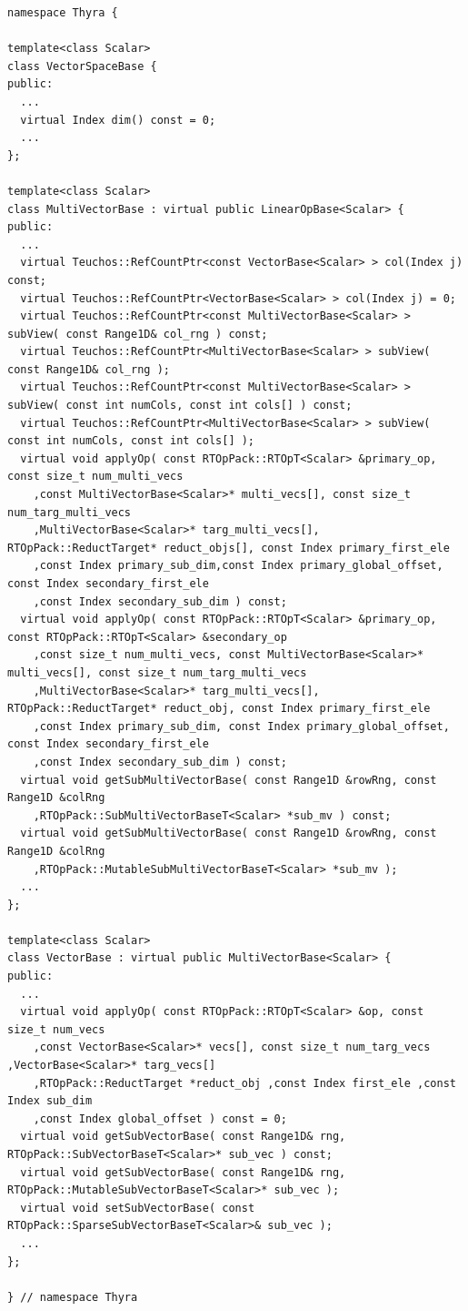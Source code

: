 \documentclass[pdf,ps2pdf,11pt]{SANDreport}
\begin{document}
{\scriptsize\begin{verbatim}
namespace Thyra {

template<class Scalar>
class VectorSpaceBase {
public:
  ...
  virtual Index dim() const = 0;
  ...
};

template<class Scalar>
class MultiVectorBase : virtual public LinearOpBase<Scalar> {
public:
  ...
  virtual Teuchos::RefCountPtr<const VectorBase<Scalar> > col(Index j) const;
  virtual Teuchos::RefCountPtr<VectorBase<Scalar> > col(Index j) = 0;
  virtual Teuchos::RefCountPtr<const MultiVectorBase<Scalar> > subView( const Range1D& col_rng ) const;
  virtual Teuchos::RefCountPtr<MultiVectorBase<Scalar> > subView( const Range1D& col_rng );
  virtual Teuchos::RefCountPtr<const MultiVectorBase<Scalar> > subView( const int numCols, const int cols[] ) const;
  virtual Teuchos::RefCountPtr<MultiVectorBase<Scalar> > subView( const int numCols, const int cols[] );
  virtual void applyOp( const RTOpPack::RTOpT<Scalar> &primary_op, const size_t num_multi_vecs
    ,const MultiVectorBase<Scalar>* multi_vecs[], const size_t num_targ_multi_vecs
    ,MultiVectorBase<Scalar>* targ_multi_vecs[], RTOpPack::ReductTarget* reduct_objs[], const Index primary_first_ele
    ,const Index primary_sub_dim,const Index primary_global_offset, const Index secondary_first_ele
    ,const Index secondary_sub_dim ) const;
  virtual void applyOp( const RTOpPack::RTOpT<Scalar> &primary_op, const RTOpPack::RTOpT<Scalar> &secondary_op
    ,const size_t num_multi_vecs, const MultiVectorBase<Scalar>* multi_vecs[], const size_t num_targ_multi_vecs
    ,MultiVectorBase<Scalar>* targ_multi_vecs[], RTOpPack::ReductTarget* reduct_obj, const Index primary_first_ele
    ,const Index primary_sub_dim, const Index primary_global_offset, const Index secondary_first_ele
    ,const Index secondary_sub_dim ) const;
  virtual void getSubMultiVectorBase( const Range1D &rowRng, const Range1D &colRng
    ,RTOpPack::SubMultiVectorBaseT<Scalar> *sub_mv ) const;
  virtual void getSubMultiVectorBase( const Range1D &rowRng, const Range1D &colRng
    ,RTOpPack::MutableSubMultiVectorBaseT<Scalar> *sub_mv );
  ...
};

template<class Scalar>
class VectorBase : virtual public MultiVectorBase<Scalar> {
public:
  ...
  virtual void applyOp( const RTOpPack::RTOpT<Scalar> &op, const size_t num_vecs
    ,const VectorBase<Scalar>* vecs[], const size_t num_targ_vecs ,VectorBase<Scalar>* targ_vecs[]
    ,RTOpPack::ReductTarget *reduct_obj ,const Index first_ele ,const Index sub_dim
    ,const Index global_offset ) const = 0;
  virtual void getSubVectorBase( const Range1D& rng, RTOpPack::SubVectorBaseT<Scalar>* sub_vec ) const;
  virtual void getSubVectorBase( const Range1D& rng, RTOpPack::MutableSubVectorBaseT<Scalar>* sub_vec );
  virtual void setSubVectorBase( const RTOpPack::SparseSubVectorBaseT<Scalar>& sub_vec );
  ...
};

} // namespace Thyra
\end{verbatim}}
\end{document}
